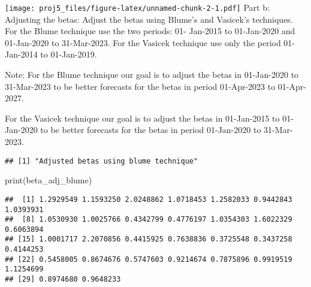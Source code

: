 \documentclass[
]{article}
\newenvironment{Shaded}{\begin{snugshade}}{\end{snugshade}}
\newcommand{\CommentTok}[1]{\textcolor[rgb]{0.56,0.35,0.01}{\textit{#1}}}
\newcommand{\DecValTok}[1]{\textcolor[rgb]{0.00,0.00,0.81}{#1}}
\newcommand{\FunctionTok}[1]{\textcolor[rgb]{0.00,0.00,0.00}{#1}}
\newcommand{\NormalTok}[1]{#1}
\newcommand{\OtherTok}[1]{\textcolor[rgb]{0.56,0.35,0.01}{#1}}
\newcommand{\SpecialCharTok}[1]{\textcolor[rgb]{0.00,0.00,0.00}{#1}}
\newcommand{\StringTok}[1]{\textcolor[rgb]{0.31,0.60,0.02}{#1}}
\begin{document}
\texttt{[image: proj5\_files/figure-latex/unnamed-chunk-2-1.pdf]} Part b:
Adjusting the betas: Adjust the betas using Blume's and Vasicek's
techniques. For the Blume technique use the two periods: 01- Jan-2015 to
01-Jan-2020 and 01-Jan-2020 to 31-Mar-2023. For the Vasicek technique
use only the period 01-Jan-2014 to 01-Jan-2019.

Note: For the Blume technique our goal is to adjust the betas in
01-Jan-2020 to 31-Mar-2023 to be better forecasts for the betas in
period 01-Apr-2023 to 01-Apr-2027.

For the Vasicek technique our goal is to adjust the betas in 01-Jan-2015
to 01-Jan-2020 to be better forecasts for the betas in period
01-Jan-2020 to 31-Mar-2023.

\begin{Shaded}
\end{Shaded}

\begin{verbatim}
## [1] "Adjusted betas using blume technique"
\end{verbatim}

\begin{Shaded}
\begin{Highlighting}[]
\FunctionTok{print}\NormalTok{(beta\_adj\_blume)}
\end{Highlighting}
\end{Shaded}

\begin{verbatim}
##  [1] 1.2929549 1.1593250 2.0248862 1.0718453 1.2582033 0.9442843 1.0393931
##  [8] 1.0530930 1.0025766 0.4342799 0.4776197 1.0354303 1.6022329 0.6063894
## [15] 1.0001717 2.2070856 0.4415925 0.7638836 0.3725548 0.3437258 0.4144253
## [22] 0.5458005 0.8674676 0.5747603 0.9214674 0.7875896 0.9919519 1.1254699
## [29] 0.8974680 0.9648233
\end{verbatim}
\end{document}
